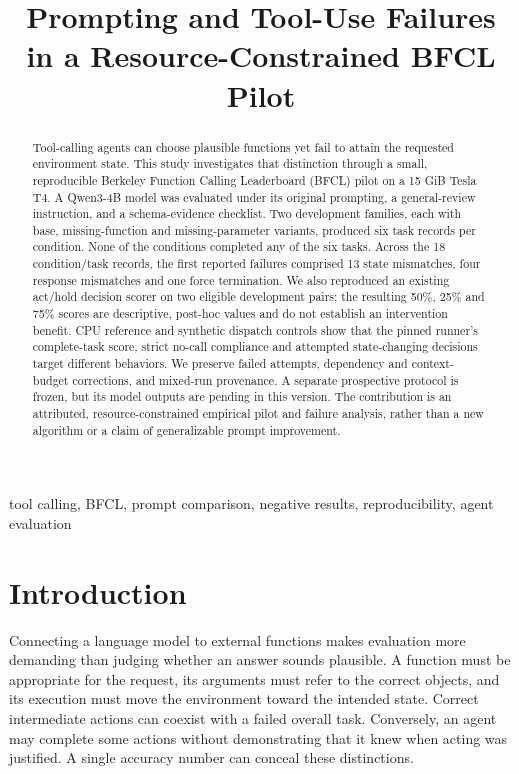\documentclass[conference]{IEEEtran}
\title{Prompting and Tool-Use Failures in a Resource-Constrained BFCL Pilot}
\author{\IEEEauthorblockN{Omkar Arjun Mohije}\IEEEauthorblockA{M.Tech, IIIT Allahabad\\AI Tools for Research -- Implementation Study}}
\begin{document}
\maketitle
\begin{abstract}
Tool-calling agents can choose plausible functions yet fail to attain the requested environment state. This study investigates that distinction through a small, reproducible Berkeley Function Calling Leaderboard (BFCL) pilot on a 15 GiB Tesla T4. A Qwen3-4B model was evaluated under its original prompting, a general-review instruction, and a schema-evidence checklist. Two development families, each with base, missing-function and missing-parameter variants, produced six task records per condition. None of the conditions completed any of the six tasks. Across the 18 condition/task records, the first reported failures comprised 13 state mismatches, four response mismatches and one force termination. We also reproduced an existing act/hold decision scorer on two eligible development pairs; the resulting 50\%, 25\% and 75\% scores are descriptive, post-hoc values and do not establish an intervention benefit. CPU reference and synthetic dispatch controls show that the pinned runner's complete-task score, strict no-call compliance and attempted state-changing decisions target different behaviors. We preserve failed attempts, dependency and context-budget corrections, and mixed-run provenance. A separate prospective protocol is frozen, but its model outputs are pending in this version. The contribution is an attributed, resource-constrained empirical pilot and failure analysis, rather than a new algorithm or a claim of generalizable prompt improvement.
\end{abstract}
\begin{IEEEkeywords}
tool calling, BFCL, prompt comparison, negative results, reproducibility, agent evaluation
\end{IEEEkeywords}

\section{Introduction}
Connecting a language model to external functions makes evaluation more demanding than judging whether an answer sounds plausible. A function must be appropriate for the request, its arguments must refer to the correct objects, and its execution must move the environment toward the intended state. Correct intermediate actions can coexist with a failed overall task. Conversely, an agent may complete some actions without demonstrating that it knew when acting was justified. A single accuracy number can conceal these distinctions.
\end{document}
